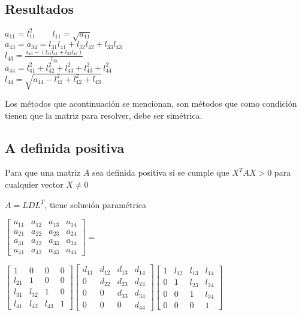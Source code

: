 \subsection*{Resultados}
\begin{center}
$a_{11}=l_{11}^2 \qquad l_{11}=\sqrt{a_{11}}$\\
$a_{43}=a_{34}=l_{31}l_{41}+l_{32}l_{42}+l_{33}l_{43}$\\
$l_{43}=\frac{a_{43}-(l_{31}l_{41}+l_{32}l_{42})}{l_{33}}$ \\
$a_{44}=l_{41}^2+l_{42}^2+l_{43}^2+l_{43}^2+l_{44}^2$ \\
$l_{44}=\sqrt{a_{44}-l_{41}^2+l_{42}^2+l_{43}} $ \\
\end{center}
Los m\'etodos que acontinuación se mencionan, son m\'etodos que como condici\'on tienen que la matriz para resolver, debe ser sim\'etrica.
\subsection*{A definida positiva}
Para que una matriz $A$ sea definida positiva si se cumple que $X^TAX>0$ para cualquier vector $X\neq0$
\begin{center}
$A=LDL^T$, tiene soluci\'on param\'etrica
\end{center}
\begin{center}
$\begin{bmatrix}
a_{11} & a_{12} & a_{13} & a_{14} \\
a_{21} & a_{22} & a_{23} & a_{24} \\
a_{31} & a_{32} & a_{33} & a_{34} \\
a_{41} & a_{42} & a_{43} & a_{44} 
\end{bmatrix}=$ \end{center}\begin{center}
$\begin{bmatrix}
1 & 0 & 0 & 0 \\
l_{21} & 1 & 0 & 0 \\
l_{31} & l_{32} & 1 & 0 \\
l_{41} & l_{42} & l_{43} & 1 
\end{bmatrix} \begin{bmatrix}
d_{11} & d_{12} & d_{13} & d_{14} \\
0 & d_{22} & d_{23} & d_{24} \\
0 & 0 & d_{33} & d_{34} \\
0 & 0 & 0 & d_{44} 
\end{bmatrix} \begin{bmatrix}
1 & l_{12} & l_{13} & l_{14} \\
0 & 1 & l_{23} & l_{24} \\
0 & 0 & 1 & l_{34} \\
0 & 0 & 0 & 1
\end{bmatrix}
$\end{center}
